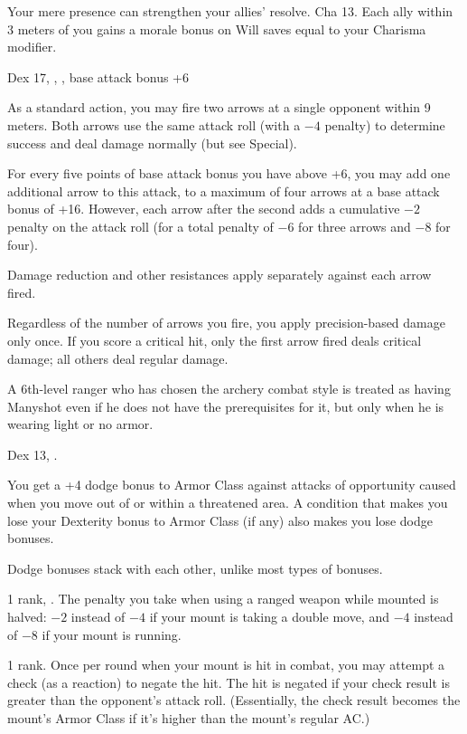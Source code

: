 {Your mere presence can strengthen your allies' resolve.}
{Cha 13.}
{Each ally within 3 meters of you gains a morale bonus on Will saves equal to your Charisma modifier.}{}{}

{}
{Dex 17, , , base attack bonus +6}
{As a standard action, you may fire two arrows at a single opponent within 9 meters. Both arrows use the same attack roll (with a $-4$ penalty) to determine success and deal damage normally (but see Special).

For every five points of base attack bonus you have above +6, you may add one additional arrow to this attack, to a maximum of four arrows at a base attack bonus of +16. However, each arrow after the second adds a cumulative $-2$ penalty on the attack roll (for a total penalty of $-6$ for three arrows and $-8$ for four).

Damage reduction and other resistances apply separately against each arrow fired.}{}
{Regardless of the number of arrows you fire, you apply precision-based damage only once. If you score a critical hit, only the first arrow fired deals critical damage; all others deal regular damage.

A 6th-level ranger who has chosen the archery combat style is treated as having Manyshot even if he does not have the prerequisites for it, but only when he is wearing light or no armor.}

{Dex 13, .}
{You get a +4 dodge bonus to Armor Class against attacks of opportunity caused when you move out of or within a threatened area. A condition that makes you lose your Dexterity bonus to Armor Class (if any) also makes you lose dodge bonuses.

Dodge bonuses stack with each other, unlike most types of bonuses.}

{ 1 rank, .}
{The penalty you take when using a ranged weapon while mounted is halved: $-2$ instead of $-4$ if your mount is taking a double move, and $-4$ instead of $-8$ if your mount is running.}

{ 1 rank.}
{Once per round when your mount is hit in combat, you may attempt a  check (as a reaction) to negate the hit. The hit is negated if your  check result is greater than the opponent's attack roll. (Essentially, the  check result becomes the mount's Armor Class if it's higher than the mount's regular AC.)}

